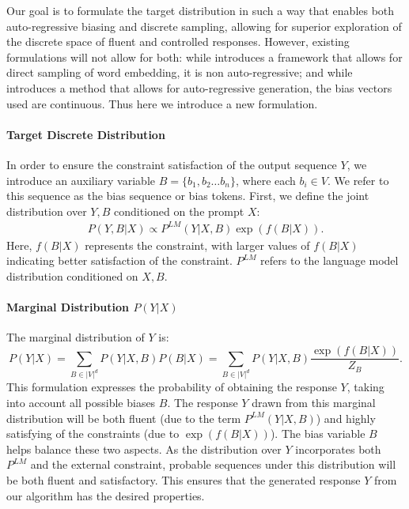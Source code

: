 Our goal is to formulate the target distribution in such a way that enables both auto-regressive biasing and discrete sampling, allowing for superior exploration of the discrete space of fluent and controlled responses.
However, existing formulations will not allow for both: while \citet{kumar2022gradient} introduces a framework that allows for direct sampling of word embedding, it is non auto-regressive; and while \citet{liu2023bolt} introduces a method that allows for auto-regressive generation, the bias vectors used are continuous. Thus here we introduce a new formulation. 

\paragraph{Target Discrete Distribution} 
In order to ensure the constraint satisfaction of the output sequence $Y$, we introduce an auxiliary variable $B = \{b_1, b_2 \dots b_n\}$, where each $b_i \in V$. We refer to this sequence as the bias sequence or bias tokens. 
First, we define the joint distribution over $Y, B$ conditioned on the prompt $X$: 
\begin{align}
\label{eq:dab-target-dist}
    P(Y, B | X) \propto P^{LM}(Y | X, B) \exp(f(B | X)).
\end{align}
Here, $f(B | X)$ represents the constraint, with larger values of \(f(B | X) \) indicating better satisfaction of the constraint. $P^{LM}$ refers to the language model distribution conditioned on $X, B$. 

\paragraph{Marginal Distribution $P(Y | X)$}
The marginal distribution of \( Y \) is:
\[
P(Y | X) = \sum_{B \in |V|^d} P(Y | X, B) P(B | X) =  \sum_{B \in |V|^d} P(Y | X, B) \frac{\exp(f(B | X))}{Z_B}.
\]
This formulation expresses the probability of obtaining the response \( Y \), taking into account all possible biases \( B \). The response \( Y \) drawn from this marginal distribution will be both fluent (due to the term \( P^{LM}(Y | X, B) \)) and highly satisfying of the constraints (due to \( \exp(f(B | X)) \)). The bias variable \( B \) helps balance these two aspects. As the distribution over $Y$ incorporates both $P^{LM}$ and the external constraint, probable sequences under this distribution will be both fluent and satisfactory. This ensures that the generated response $Y$ from our algorithm has the desired properties.

